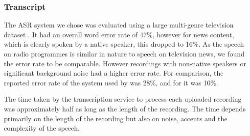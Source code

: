 \subsubsection{Transcript}\label{sec:transcript}
The ASR system we chose was evaluated using a large multi-genre television dataset \citep{Bell2015}.  It had
an overall word error rate of 47\%, however for news content, which is clearly spoken by a native speaker, this dropped
to 16\%. As the speech on radio programmes is similar in nature to speech on television news, we found the error rate
to be comparable. However recordings with non-native speakers or significant background noise had a higher error rate.
For comparison, the reported error rate of the system used by \citet{Whittaker2004} was 28\%, and for
\citet{Sivaraman2016} it was 10\%.

The time taken by the transcription service to process each uploaded recording
was approximately half as long as the length of the recording. The time
depends primarily on the length of the recording but also on noise, accents and the complexity of the speech.





